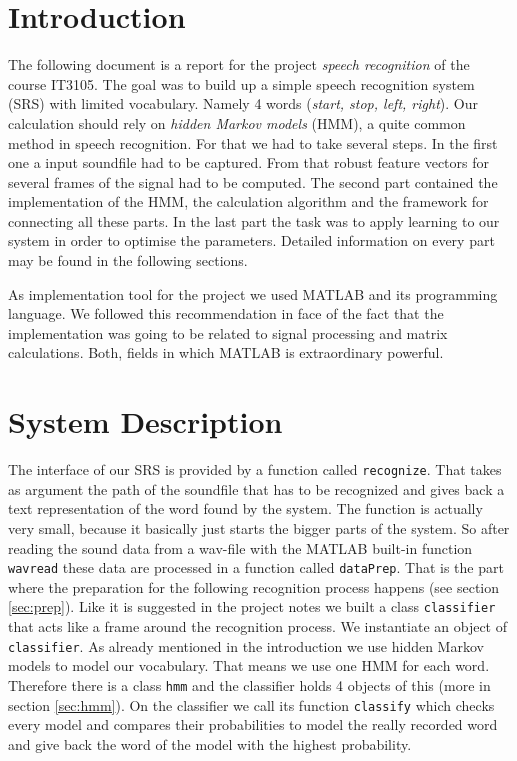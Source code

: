 \documentclass[titlepage]{article}
\begin{document}
\section{Introduction}
The following document is a report for the project \emph{speech recognition} of the course IT3105. The goal was to build up a simple speech recognition system (SRS) with limited vocabulary. Namely 4 words (\emph{start, stop, left, right}). Our calculation should rely on \emph{hidden Markov models} (HMM), a quite common method in speech recognition. For that we had to take several steps. In the first one a input soundfile had to be captured. From that robust feature vectors for several frames of the signal had to be computed. The second part contained the implementation of the HMM, the calculation algorithm and the framework for connecting all these parts. In the last part the task was to apply learning to our system in order to optimise the parameters. Detailed information on every part may be found in the following sections.

As implementation tool for the project we used MATLAB and its programming language. We followed this recommendation in face of the fact that the implementation was going to be related to signal processing and matrix calculations. Both, fields in which MATLAB is extraordinary powerful.

\section{System Description}\label{sec:system}
The interface of our SRS is provided by a function called \lstinline&recognize&. That takes as argument the path of the soundfile that has to be recognized and gives back a text representation of the word found by the system. The function is actually very small, because it basically just starts the bigger parts of the system. So after reading the sound data from a wav-file with the MATLAB built-in function \lstinline&wavread& these data are processed in a function called \lstinline&dataPrep&. That is the part where the preparation for the following recognition process happens (see section \ref{sec:prep}).
Like it is suggested in the project notes we built a class \lstinline&classifier& that acts like a frame around the recognition process. We instantiate an object of \lstinline&classifier&. As already mentioned in the introduction we use hidden Markov models to model our vocabulary. That means we use one HMM for each word. Therefore there is a class \lstinline&hmm& and the classifier holds 4 objects of this (more in section \ref{sec:hmm}). On the classifier we call its function \lstinline&classify& which checks every model and compares their probabilities to model the really recorded word and give back the word of the model with the highest probability.
\end{document}
